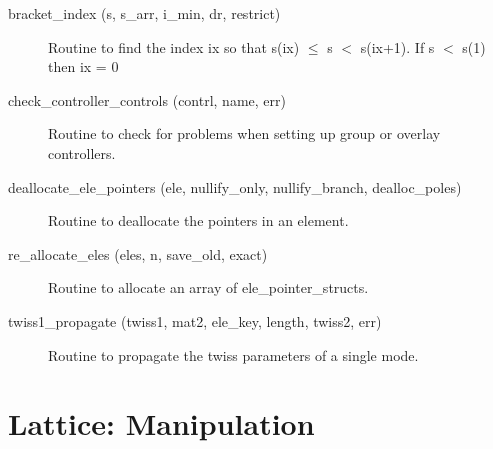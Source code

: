 \begin{description}

\label{r:bracket.index}
\item[bracket_index (s, s_arr, i_min, dr, restrict)] \Newline
Routine to find the index ix so that s(ix) $\le$ s $<$ s(ix+1). 
If s $<$ s(1) then ix = 0 

\label{r:check.controller.controls}
\item[check_controller_controls (contrl, name, err)] \Newline 
Routine to check for problems when setting up group or overlay controllers.

\label{r:deallocate.ele.pointers}
\item[deallocate_ele_pointers (ele, nullify_only, nullify_branch, dealloc_poles)] \Newline
Routine to deallocate the pointers in an element. 

\label{r:re.allocate.eles}
\item[re_allocate_eles (eles, n, save_old, exact)] \Newline 
Routine to allocate an array of ele_pointer_structs.

\label{r:twiss1.propagate}
\item[twiss1_propagate (twiss1, mat2, ele_key, length, twiss2, err)] \Newline 
Routine to propagate the twiss parameters of a single mode.

\end{description}

\section{Lattice: Manipulation}
\label{r:trans}    

